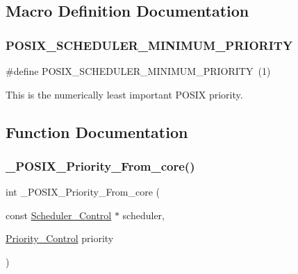 \subsection{Macro Definition Documentation}
\mbox{\label{group__POSIX__PRIORITY_ga119f39be5f59872d706c6ab781f27173}} 
\subsubsection{\texorpdfstring{POSIX\_SCHEDULER\_MINIMUM\_PRIORITY}{POSIX\_SCHEDULER\_MINIMUM\_PRIORITY}}
{\footnotesize\ttfamily \#define P\+O\+S\+I\+X\+\_\+\+S\+C\+H\+E\+D\+U\+L\+E\+R\+\_\+\+M\+I\+N\+I\+M\+U\+M\+\_\+\+P\+R\+I\+O\+R\+I\+TY~(1)}

This is the numerically least important P\+O\+S\+IX priority. 

\subsection{Function Documentation}
\mbox{\label{group__POSIX__PRIORITY_gad0693fb0599992826c0948cd9bda4d69}} 
\subsubsection{\texorpdfstring{\_POSIX\_Priority\_From\_core()}{\_POSIX\_Priority\_From\_core()}}
{\footnotesize\ttfamily int \+\_\+\+P\+O\+S\+I\+X\+\_\+\+Priority\+\_\+\+From\+\_\+core (\begin{DoxyParamCaption}\item[{const \mbox{\hyperlink{struct__Scheduler__Control}{Scheduler\+\_\+\+Control}} $\ast$}]{scheduler,  }\item[{\mbox{\hyperlink{group__RTEMSScorePriority_ga59d02b58072d31a9a1cfe644557aefe2}{Priority\+\_\+\+Control}}}]{priority }\end{DoxyParamCaption})}




